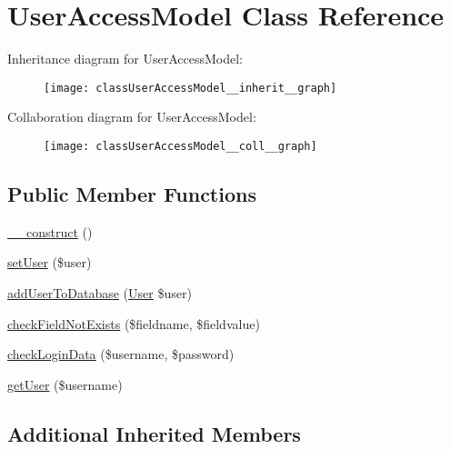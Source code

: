 \hypertarget{classUserAccessModel}{\section{User\+Access\+Model Class Reference}
\label{classUserAccessModel}
}


Inheritance diagram for User\+Access\+Model\+:\nopagebreak
\begin{figure}[H]
\begin{center}
\leavevmode
\texttt{[image: classUserAccessModel\_\_inherit\_\_graph]}
\end{center}
\end{figure}


Collaboration diagram for User\+Access\+Model\+:\nopagebreak
\begin{figure}[H]
\begin{center}
\leavevmode
\texttt{[image: classUserAccessModel\_\_coll\_\_graph]}
\end{center}
\end{figure}
\subsection*{Public Member Functions}
\begin{DoxyCompactItemize}
\item 
\hyperlink{classUserAccessModel_a4ff78b6bca940216de17457d8ec7f76d}{\+\_\+\+\_\+construct} ()
\item 
\hyperlink{classUserAccessModel_a65363d66e0dcf1cdf7caea08de553e1e}{set\+User} (\$user)
\item 
\hyperlink{classUserAccessModel_a8b000dcb063400f3068ff83a4a467021}{add\+User\+To\+Database} (\hyperlink{classUser}{User} \$user)
\item 
\hyperlink{classUserAccessModel_a7ed6ab03bbd86466f0864996390254af}{check\+Field\+Not\+Exists} (\$fieldname, \$fieldvalue)
\item 
\hyperlink{classUserAccessModel_a4120f778b0415dec524876f84e6c87af}{check\+Login\+Data} (\$username, \$password)
\item 
\hyperlink{classUserAccessModel_a81acfe08b082369c72f78c5e8327ea72}{get\+User} (\$username)
\end{DoxyCompactItemize}
\subsection*{Additional Inherited Members}


